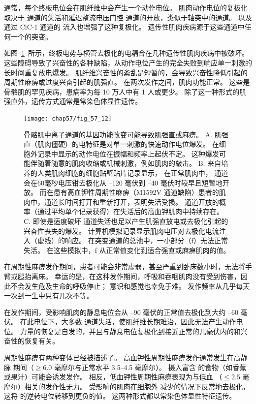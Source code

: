 通常，每个终板电位会在肌纤维中会产生一个动作电位。
肌肉动作电位的复极化取决于  通道的失活和延迟整流电压门控  通道的开放，类似于轴突中的通道。
以及通过 ClC-1  通道的  流入也增强了这种复极化。
遗传性肌肉疾病源于这些通道中任何一个的突变。


如图~\ref{fig:57_12}~所示，终板电势与横管去极化的电耦合在几种遗传性肌肉疾病中被破坏。
这些障碍导致了兴奋性的各种缺陷，从动作电位产生的完全失败到响应单一刺激的长时间重复放电爆发。
肌纤维兴奋性的紊乱是短暂的，会导致兴奋性降低引起的周期性麻痹或过度兴奋引起的肌强直。
在两次发作之间，肌肉功能正常。
这些是骨骼肌的罕见疾病，患病率为每 10 万人中有 1 人或更少。
除了这一种形式的肌强直外，遗传方式通常是常染色体显性遗传。


\begin{figure}[htbp]
	\centering
	\texttt{[image: chap57/fig\_57\_12]}
	\caption{骨骼肌中离子通道的基因功能改变可能导致肌强直或麻痹。
		A. 肌强直（肌肉僵硬）的电特征是对单一刺激的快速动作电位爆发。
		在细胞外记录中显示的动作电位在振幅和频率上起伏不定。
		这种爆发可能伴随着随意的肌肉收缩或机械刺激，例如肌肉的敲击。
		B. 来自培养的人类肌肉细胞的细胞贴壁贴片记录显示，
		在正常肌肉中， 通道会在60毫秒电压钳去极化从 –120 毫伏到 –40 毫伏时较早且短暂地开放。
		而在患有高血钾性周期性麻痹（M1592V  通道缺陷）患者的肌肉中，通道长时间打开和重新打开，表明失活受损。
		通道开放的概率（通过平均单个记录获得）在失活后的高血钾肌肉中持续存在。
		C. 即使是适度破坏  通道失活也足以产生肌强直放电或去极化引起的兴奋性丧失的爆发。
		计算机模拟记录显示肌肉电压对去极化电流注入（虚线）的响应。
		在突变通道的总池中，一小部分（f）无法正常失活。
		在这些模拟中，f 从正常值变化到适合强直或麻痹肌肉的值。}
	\label{fig:57_12}
\end{figure}


在周期性麻痹发作期间，患者可能会非常虚弱，甚至严重到卧床数小时，无法将手臂或腿抬离床。
幸运的是，在这种发作期间，呼吸和吞咽肌肉没有受到伤害，因此不会发生危及生命的呼吸停止；
意识和感觉也幸免于难。
发作频率从几乎每天一次到一生中只有几次不等。


在发作期间，受影响肌肉的静息电位会从 –90 毫伏的正常值去极化到大约 –60 毫伏。
在此电位下，大多数  通道失活，使肌纤维长期难治，因此无法产生动作电位。
力量的恢复是自发的，并且与静息电位复极化到接近正常的几毫伏内的和兴奋性的恢复有关。


周期性麻痹有两种变体已经被描述了。
高血钾性周期性麻痹发作通常发生在高静脉  期间（$\geq$6.0 毫摩尔与正常水平 3.5–4.5 毫摩尔）。
摄入富含  的食物（如香蕉或果汁）可能会诱发发作。
相反，低血钾性周期性麻痹表现为与低血 （$\leq$2.5 毫摩尔）相关的发作性无力。
受影响的肌肉在细胞外  减少的情况下反常地去极化，这将  的逆转电位转移到更负的值。
这两种形式都以常染色体显性特征遗传。


